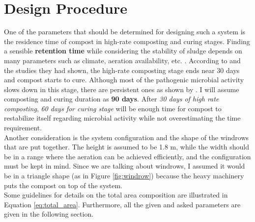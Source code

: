 \documentclass[a4paper]{article}
\begin{document}
\section*{Design Procedure}
One of the parameters that should be determined for designing such a system is the residence time of compost in high-rate composting and curing stages. Finding a sensible \textbf{retention time} while considering the stability of sludge depends on many parameters such as climate, aeration availability, etc. \autocite{sanin2011}. According to \textcite{vesilind1988} and the studies they had shown, the high-rate composting stage ends near 30 days and compost starts to cure. Although most of the pathogenic microbial activity slows down in this stage, there are persistent ones as shown by \textcite{sanin2011}. I will assume composting and curing duration as \textbf{90 days}. After \textsl{30 days of high rate composting}, \textsl{60 days for curing stage} will be enough time for compost to restabilize itself regarding microbial activity while not overestimating the time requirement.\\
Another consideration is the system configuration and the shape of the windrows that are put together. The height is assumed to be 1.8 m, while the width should be in a range where the aeration can be achieved efficiently, and the configuration must be kept in mind. Since we are talking about windrows, I assumed it would be in a triangle shape (as in Figure \ref{fig:windrow}) because the heavy machinery puts the compost on top of the system.\\
Some guidelines for details on the total area composition are illustrated in Equation \ref{eq:total_area}. Furthermore, all the given and asked parameters are given in the following section.
\end{document}
